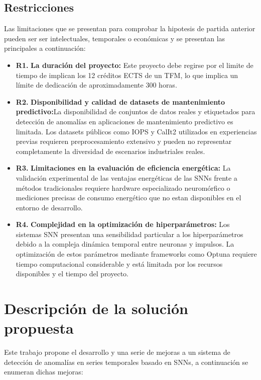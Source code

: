 \subsection{Restricciones}
Las limitaciones que se presentan para comprobar la hipotesis de partida anterior pueden ser ser intelectuales, temporales o económicas y se presentan las principales a continuación:
\begin{itemize}
    \item \textbf{R1.} \textbf{La duración del proyecto:} Este proyecto debe regirse por el limite de tiempo de implican los 12 créditos ECTS de un TFM, lo que implica un límite de dedicación de aproximadamente 300 horas.
    \item \textbf{R2.} \textbf{Disponibilidad y calidad de datasets de mantenimiento predictivo:}La disponibilidad de conjuntos de datos reales y etiquetados para detección de anomalías en aplicaciones de mantenimiento predictivo es limitada. Los datasets públicos como IOPS y CalIt2 utilizados en experiencias previas requieren preprocesamiento extensivo y pueden no representar completamente la diversidad de escenarios industriales reales.
    \item \textbf{R3.} \textbf{Limitaciones en la evaluación de eficiencia energética:} La validación experimental de las ventajas energéticas de las SNNs frente a métodos tradicionales requiere hardware especializado neuromórfico o mediciones precisas de consumo energético que no estan disponibles en el entorno de desarrollo.
    \item \textbf{R4.} \textbf{Complejidad en la optimización de hiperparámetros:} Los sistemas SNN presentan una sensibilidad particular a los hiperparámetros debido a la compleja dinámica temporal entre neuronas y impulsos. La optimización de estos parámetros mediante frameworks como Optuna requiere tiempo computacional considerable y está limitada por los recursos disponibles y el tiempo del proyecto.
\end{itemize}

\section{Descripción de la solución propuesta}

Este trabajo propone el desarrollo y una serie de mejoras a un sistema de detección de anomalías en series temporales basado en SNNs, a continuación se enumeran dichas mejoras:

